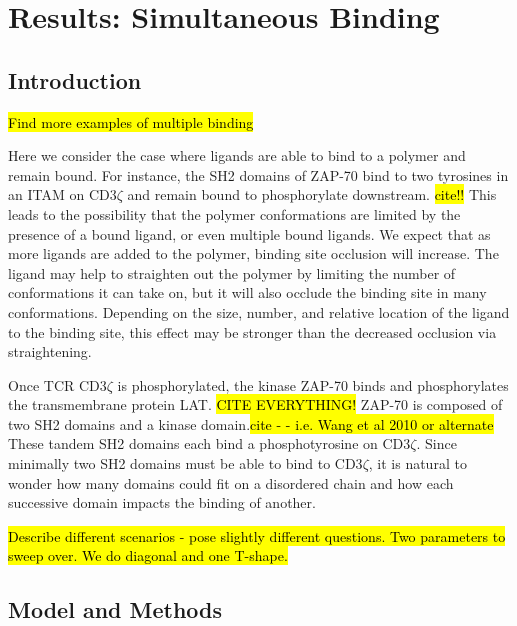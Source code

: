 \documentclass[../../AdvancementSummary.tex]{subfiles}
\begin{document}
\section{Results: Simultaneous Binding}
\label{sec: SimultaneousBinding}
\subsection{Introduction}

\hl{Find more examples of multiple binding}

Here we consider the case where ligands are able to bind to a polymer and remain bound.  For instance, the SH2 domains of ZAP-70 bind to two tyrosines in an ITAM on CD3$\zeta$ and remain bound to phosphorylate downstream. \hl{cite!!} This leads to the possibility that the polymer conformations are limited by the presence of a bound ligand, or even multiple bound ligands.  We expect that as more ligands are added to the polymer, binding site occlusion will increase.  The ligand may help to straighten out the polymer by limiting the number of conformations it can take on, but it will also occlude the binding site in many conformations.  Depending on the size, number, and relative location of the ligand to the binding site, this effect may be stronger than the decreased occlusion via straightening.  

Once TCR CD3$\zeta$ is phosphorylated, the kinase ZAP-70 binds and phosphorylates the transmembrane protein LAT. \hl{CITE EVERYTHING!} ZAP-70 is composed of two SH2 domains and a kinase domain.\hl{cite -  - i.e. Wang et al 2010 or alternate} These tandem SH2 domains each bind a phosphotyrosine on CD3$\zeta$. Since minimally two SH2 domains must be able to bind to CD3$\zeta$, it is natural to wonder how many domains could fit on a disordered chain and how each successive domain impacts the binding of another. 

\hl{Describe different scenarios - pose slightly different questions. Two parameters to sweep over. We do diagonal and one T-shape.}



\subsection{Model and Methods}
\end{document}
